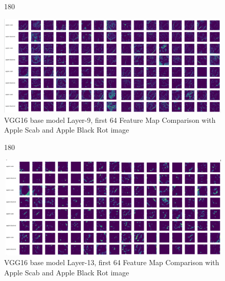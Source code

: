 \begin{figure}
    \centering
    \begin{turn}{180}
        \begin{minipage}{\linewidth}
        \centering
        \includegraphics[width=1\linewidth]{graphics//chapter7/fmap comp abr as l9.png}
        \caption{VGG16 base model Layer-9, first 64 Feature Map Comparison with Apple Scab and Apple Black Rot image}
        \label{fig:comp-3}
        \end{minipage}
    \end{turn}
\end{figure}


\begin{figure}
    \centering
    \begin{turn}{180}
        \begin{minipage}{\linewidth}
        \centering
        \includegraphics[width=1\linewidth]{graphics//chapter7/fmap comp l15 abr as.png}
        \caption{VGG16 base model Layer-13, first 64 Feature Map Comparison with Apple Scab and Apple Black Rot image}
        \label{fig:comp-4}
        \end{minipage}
    \end{turn}
\end{figure}

